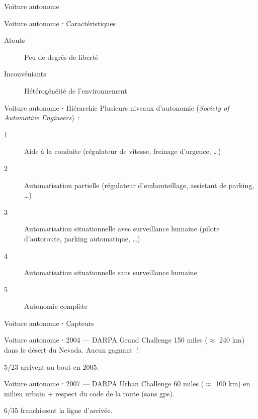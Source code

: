 \begin{frame}{Voiture autonome}
\end{frame}

\begin{frame}{Voiture autonome ⋅ Caractéristiques}
  \begin{description}
    \item[Atouts] Peu de degrés de liberté
    \item[Inconvéniants] Hétérogénéité de l'environnement
  \end{description}
\end{frame}

\begin{frame}{Voiture autonome ⋅ Hiérarchie}
  Plusieurs niveaux d'autonomie (\textit{Society of Automotive Engineers})~:
  \begin{description}
    \item[1] Aide à la conduite (régulateur de vitesse, freinage d'urgence, …)
    \item[2] Automatisation partielle (régulateur d'embouteillage, assistant de parking, …)
    \item[3] Automatisation situationnelle avec surveillance humaine (pilote d'autoroute, parking automatique, …)
    \item[4] Automatisation situationnelle sans surveillance humaine
    \item[5] Autonomie complète
  \end{description}
\end{frame}

\begin{frame}{Voiture autonome ⋅ Capteurs}
\end{frame}

\begin{frame}{Voiture autonome ⋅ 2004 --- DARPA Grand Challenge}
  150 miles ($\approx$ 240 km) dans le désert du Nevada. Aucun gagnant~!

  5/23 arrivent au bout en 2005.

\end{frame}

\begin{frame}{Voiture autonome ⋅ 2007 --- DARPA Urban Challenge}
  60 miles ($\approx$ 100 km) en milieu urbain + respect du code de la route (sans gps).

  6/35 franchissent la ligne d'arrivée.

\end{frame}

